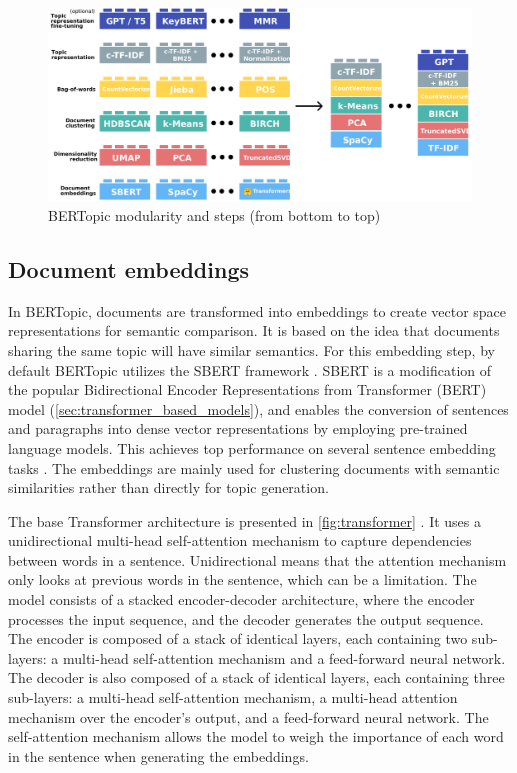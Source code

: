 \begin{figure}[h] %
    \centering
    \includegraphics[width=\textwidth]{figures/modularity_modified.pdf}
    \caption{BERTopic modularity and steps (from bottom to top)}
    \label{fig:modularity_modified}
\end{figure}

\subsection{Document embeddings}

In BERTopic, documents are transformed into embeddings to create vector space representations for semantic comparison. It is based on the idea that documents sharing the same topic will have similar semantics. For this embedding step, by default BERTopic utilizes the SBERT framework \cite{reimers_sentence-bert_2019}. SBERT is a modification of the popular Bidirectional Encoder Representations from Transformer (BERT) model (\cref{sec:transformer_based_models}), and enables the conversion of sentences and paragraphs into dense vector representations by employing pre-trained language models. This achieves top performance on several sentence embedding tasks \cite{reimers_making_2020}. The embeddings are mainly used for clustering documents with semantic similarities rather than directly for topic generation.

The base Transformer architecture is presented in \cref{fig:transformer} \cite{vaswani_attention_2017}. It uses a unidirectional multi-head self-attention mechanism to capture dependencies between words in a sentence. Unidirectional means that the attention mechanism only looks at previous words in the sentence, which can be a limitation. The model consists of a stacked encoder-decoder architecture, where the encoder processes the input sequence, and the decoder generates the output sequence. The encoder is composed of a stack of identical layers, each containing two sub-layers: a multi-head self-attention mechanism and a feed-forward neural network. The decoder is also composed of a stack of identical layers, each containing three sub-layers: a multi-head self-attention mechanism, a multi-head attention mechanism over the encoder's output, and a feed-forward neural network. The self-attention mechanism allows the model to weigh the importance of each word in the sentence when generating the embeddings.

